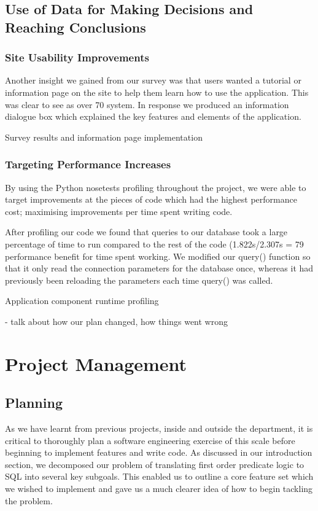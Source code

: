 \documentclass[a4paper, 11pt]{article}
\begin{document}
  \subsection{Use of Data for Making Decisions and Reaching Conclusions}
    \subsubsection{Site Usability Improvements}
    Another insight we gained from our survey was that users wanted a tutorial
    or information page on the site to help them learn how to use the
    application. This was clear to see as over 70%
    system. In response we produced an information dialogue box which explained
    the key features and elements of the application.

    Survey results and information page implementation
 
    \subsubsection{Targeting Performance Increases}
    By using the Python nosetests profiling throughout the project, we were
    able to target improvements at the pieces of code which had the highest
    performance cost; maximising improvements per time spent writing code.

    After profiling our code we found that queries to our database took a large
    percentage of time to run compared to the rest of the code (1.822s/2.307s =
    79%
    performance benefit for time spent working. We modified our query() function
    so that it only read the connection parameters for the database once,
    whereas it had previously been reloading the parameters each time query()
    was called.

    Application component runtime profiling

  - talk about how our plan changed, how things went wrong



\section{Project Management}
  \subsection{Planning}
    As we have learnt from previous projects, inside and outside the
    department, it is critical to thoroughly plan a software engineering
    exercise of this scale before beginning to implement features and write
    code. As discussed in our introduction section, we decomposed our problem
    of translating first order predicate logic to SQL into several key
    subgoals. This enabled us to outline a core feature set which we wished to
    implement and gave us a much clearer idea of how to begin tackling the
    problem.
\end{document}
